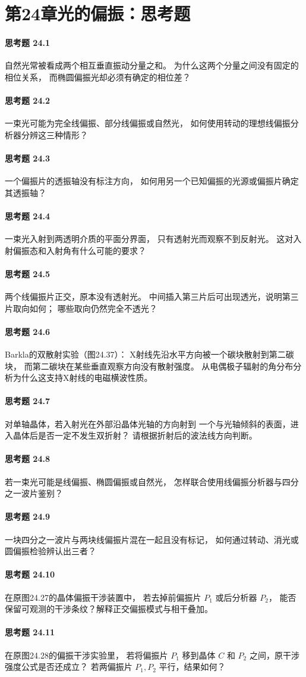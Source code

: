\section*{第24章\quad 光的偏振：思考题}
\paragraph{思考题 24.1}
自然光常被看成两个相互垂直振动分量之和。
为什么这两个分量之间没有固定的相位关系，
而椭圆偏振光却必须有确定的相位差？
\paragraph{思考题 24.2}
一束光可能为完全线偏振、部分线偏振或自然光，
如何使用转动的理想线偏振分析器分辨这三种情形？
\paragraph{思考题 24.3}
一个偏振片的透振轴没有标注方向，
如何用另一个已知偏振的光源或偏振片确定其透振轴？
\paragraph{思考题 24.4}
一束光入射到两透明介质的平面分界面，
只有透射光而观察不到反射光。
这对入射偏振态和入射角有什么可能的要求？
\paragraph{思考题 24.5}
两个线偏振片正交，原本没有透射光。
中间插入第三片后可出现透光，说明第三片取向如何；
哪些取向仍然完全不透光？
\paragraph{思考题 24.6}
Barkla的双散射实验（图24.37）：
X射线先沿水平方向被一个碳块散射到第二碳块，
而第二碳块在某些垂直观察方向没有散射强度。
从电偶极子辐射的角分布分析为什么这支持X射线的电磁横波性质。
\paragraph{思考题 24.7}
对单轴晶体，若入射光在外部沿晶体光轴的方向射到
一个与光轴倾斜的表面，进入晶体后是否一定不发生双折射？
请根据折射后的波法线方向判断。
\paragraph{思考题 24.8}
若一束光可能是线偏振、椭圆偏振或自然光，
怎样联合使用线偏振分析器与四分之一波片鉴别？
\paragraph{思考题 24.9}
一块四分之一波片与两块线偏振片混在一起且没有标记，
如何通过转动、消光或圆偏振检验辨认出三者？
\paragraph{思考题 24.10}
在原图24.27的晶体偏振干涉装置中，
若去掉前偏振片 \(P_1\) 或后分析器 \(P_2\)，
能否保留可观测的干涉条纹？解释正交偏振模式与相干叠加。
\paragraph{思考题 24.11}
在原图24.28的偏振干涉实验里，
若将偏振片 \(P_1\) 移到晶体 \(C\)
和 \(P_2\) 之间，原干涉强度公式是否还成立？
若两偏振片 \(P_1,P_2\) 平行，结果如何？
